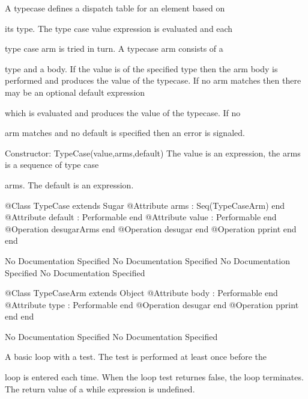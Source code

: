        A typecase defines a dispatch table for an element based on

       its type. The type case value expression is evaluated and each

       type case arm is tried in turn. A typecase arm consists of a

       type and a body. If the value is of the specified type then the 
       arm body is performed and produces the value of the typecase.
       If no arm matches then there may be an optional default expression

       which is evaluated and produces the value of the typecase. If no

       arm matches and no default is specified then an error is signaled.
       
       Constructor: TypeCase(value,arms,default)
         The value is an expression, the arms is a sequence of type case

         arms. The default is an expression.
\begin{Interface}
@Class TypeCase extends Sugar
  @Attribute arms : Seq(TypeCaseArm) end
  @Attribute default : Performable end
  @Attribute value : Performable end
  @Operation desugarArms end
  @Operation desugar end
  @Operation pprint end
end
\end{Interface}
No Documentation Specified
No Documentation Specified
No Documentation Specified
No Documentation Specified
\begin{Interface}
@Class TypeCaseArm extends Object
  @Attribute body : Performable end
  @Attribute type : Performable end
  @Operation desugar end
  @Operation pprint end
end
\end{Interface}
No Documentation Specified
No Documentation Specified

      A basic loop with a test. The test is performed at least once before the

      loop is entered each time. When the loop test returnes false, the loop terminates.
      The return value of a while expression is undefined.
      

